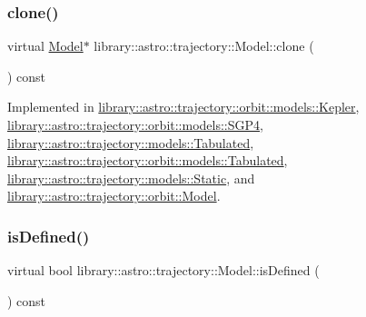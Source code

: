 \mbox{\label{classlibrary_1_1astro_1_1trajectory_1_1_model_ad6181e14aea57534897e7446a2a27578}} 
\subsubsection{\texorpdfstring{clone()}{clone()}}
{\footnotesize\ttfamily virtual \hyperlink{classlibrary_1_1astro_1_1trajectory_1_1_model}{Model}$\ast$ library\+::astro\+::trajectory\+::\+Model\+::clone (\begin{DoxyParamCaption}{ }\end{DoxyParamCaption}) const\hspace{0.3cm}{\ttfamily [pure virtual]}}



Implemented in \hyperlink{classlibrary_1_1astro_1_1trajectory_1_1orbit_1_1models_1_1_kepler_ac78a023cde4a61c62309051c9147d66e}{library\+::astro\+::trajectory\+::orbit\+::models\+::\+Kepler}, \hyperlink{classlibrary_1_1astro_1_1trajectory_1_1orbit_1_1models_1_1_s_g_p4_afa3add6c6855ac1da5632b17986dca02}{library\+::astro\+::trajectory\+::orbit\+::models\+::\+S\+G\+P4}, \hyperlink{classlibrary_1_1astro_1_1trajectory_1_1models_1_1_tabulated_a192cfb0ceb4a11d02578adc9702cabc1}{library\+::astro\+::trajectory\+::models\+::\+Tabulated}, \hyperlink{classlibrary_1_1astro_1_1trajectory_1_1orbit_1_1models_1_1_tabulated_a8ccec23a49086c6c3fbda2cc81e7a4dc}{library\+::astro\+::trajectory\+::orbit\+::models\+::\+Tabulated}, \hyperlink{classlibrary_1_1astro_1_1trajectory_1_1models_1_1_static_a3586bbfdd6fc3958b18a2ffcb3b23fd4}{library\+::astro\+::trajectory\+::models\+::\+Static}, and \hyperlink{classlibrary_1_1astro_1_1trajectory_1_1orbit_1_1_model_a45d75e4d212a9bb01aa596eaeeae43ae}{library\+::astro\+::trajectory\+::orbit\+::\+Model}.

\mbox{\label{classlibrary_1_1astro_1_1trajectory_1_1_model_a9b55db62f22c3493313661bacd9f7c1b}} 
\subsubsection{\texorpdfstring{is\+Defined()}{isDefined()}}
{\footnotesize\ttfamily virtual bool library\+::astro\+::trajectory\+::\+Model\+::is\+Defined (\begin{DoxyParamCaption}{ }\end{DoxyParamCaption}) const\hspace{0.3cm}{\ttfamily [pure virtual]}}



